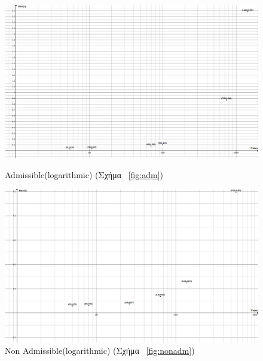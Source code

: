 \documentclass[a4paper,9pt]{article}
\begin{document}
\begin{figure}[H]
    \centering
    \begin{minipage}[b]{0.4\textwidth}
        \raggedleft
        \includegraphics[width=0.3\textheight]{files/Adm.png}
        \caption{Admissible(logarithmic) (Σχήμα ~\ref{fig:adm})}
    \end{minipage}
    \hspace{1cm}
    \begin{minipage}[b]{0.4\textwidth}
        \begin{flushright}
            \raggedright
            \includegraphics[width=0.3\textheight]{files/NonAdm.png}
            \caption{Non Admissible(logarithmic) (Σχήμα ~\ref{fig:nonadm})}
        \end{flushright}
    \end{minipage}
\end{figure}
\end{document}
